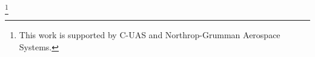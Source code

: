 \documentclass[manuscript, review, screen]{acmart}
\begin{document}

%
%



\thanks{This work is supported by C-UAS and Northrop-Grumman Aerospace Systems.}


\maketitle

% 
% 








\end{document}
